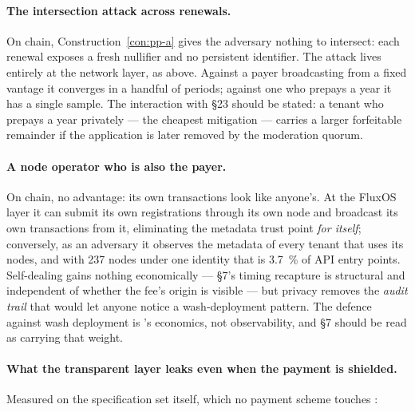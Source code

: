 \paragraph{The intersection attack across renewals.} On chain, Construction~\ref{con:pp-a} gives the
adversary nothing to intersect: each renewal exposes a fresh nullifier and no persistent identifier.
The attack lives entirely at the network layer, as above. Against a payer broadcasting from a fixed
vantage it converges in a handful of periods; against one who prepays a year it has a single sample.
The interaction with \S23 should be stated: a tenant who prepays a year privately --- the cheapest
mitigation --- carries a larger forfeitable remainder if the application is later removed by the
moderation quorum. 

\paragraph{A node operator who is also the payer.} On chain, no advantage: its own transactions look
like anyone's. At the FluxOS layer it can submit its own registrations through its own node and
broadcast its own transactions from it, eliminating the metadata trust point \emph{for itself};
conversely, as an adversary it observes the metadata of every tenant that uses its nodes, and with
\num{237} nodes under one identity that is \qty{3.7}{\percent} of API entry points. Self-dealing gains
nothing economically --- \S7's timing recapture is structural and independent of whether the fee's
origin is visible --- but privacy removes the \emph{audit trail} that would let anyone notice a
wash-deployment pattern. The defence against wash deployment is \PNR's economics, not observability,
and \S7 should be read as carrying that weight.

\paragraph{What the transparent layer leaks even when the payment is shielded.} Measured on the
specification set itself, which no payment scheme touches
:

